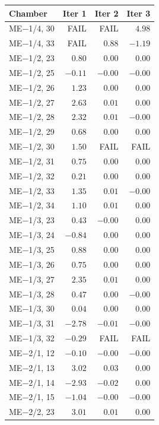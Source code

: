 \documentclass[compress]{beamer}
\begin{document}
\begin{frame}
\begin{columns}
\begin{tabular}{l r r r}
Chamber & Iter 1 & Iter 2 & Iter 3 \\\hline
ME$-$1/4, 30 &  FAIL &  FAIL &  $ 4.98$ \\
ME$-$1/4, 33 &  FAIL &  $ 0.88$ &  $-1.19$ \\
ME$-$1/2, 23 &  $ 0.80$ &  $ 0.00$ &  $ 0.00$ \\
ME$-$1/2, 25 &  $-0.11$ &  $-0.00$ &  $-0.00$ \\
ME$-$1/2, 26 &  $ 1.23$ &  $ 0.00$ &  $ 0.00$ \\
ME$-$1/2, 27 &  $ 2.63$ &  $ 0.01$ &  $ 0.00$ \\
ME$-$1/2, 28 &  $ 2.32$ &  $ 0.01$ &  $-0.00$ \\
ME$-$1/2, 29 &  $ 0.68$ &  $ 0.00$ &  $ 0.00$ \\
ME$-$1/2, 30 &  $ 1.50$ &  FAIL &  FAIL \\
ME$-$1/2, 31 &  $ 0.75$ &  $ 0.00$ &  $ 0.00$ \\
ME$-$1/2, 32 &  $ 0.21$ &  $ 0.00$ &  $ 0.00$ \\
ME$-$1/2, 33 &  $ 1.35$ &  $ 0.01$ &  $-0.00$ \\
ME$-$1/2, 34 &  $ 1.10$ &  $ 0.01$ &  $ 0.00$ \\
ME$-$1/3, 23 &  $ 0.43$ &  $-0.00$ &  $ 0.00$ \\
ME$-$1/3, 24 &  $-0.84$ &  $ 0.00$ &  $ 0.00$ \\
ME$-$1/3, 25 &  $ 0.88$ &  $ 0.00$ &  $ 0.00$ \\
ME$-$1/3, 26 &  $ 0.75$ &  $ 0.00$ &  $ 0.00$ \\
ME$-$1/3, 27 &  $ 2.35$ &  $ 0.01$ &  $ 0.00$ \\
ME$-$1/3, 28 &  $ 0.47$ &  $ 0.00$ &  $-0.00$ \\
ME$-$1/3, 30 &  $ 0.04$ &  $ 0.00$ &  $ 0.00$ \\
ME$-$1/3, 31 &  $-2.78$ &  $-0.01$ &  $-0.00$ \\
ME$-$1/3, 32 &  $-0.29$ &  FAIL &  FAIL \\
ME$-$2/1, 12 &  $-0.10$ &  $-0.00$ &  $-0.00$ \\
ME$-$2/1, 13 &  $ 3.02$ &  $ 0.03$ &  $ 0.00$ \\
ME$-$2/1, 14 &  $-2.93$ &  $-0.02$ &  $ 0.00$ \\
ME$-$2/1, 15 &  $-1.04$ &  $-0.00$ &  $-0.00$ \\
ME$-$2/2, 23 &  $ 3.01$ &  $ 0.01$ &  $ 0.00$ \\

\end{tabular}
\end{columns}
\end{frame}
\end{document}
